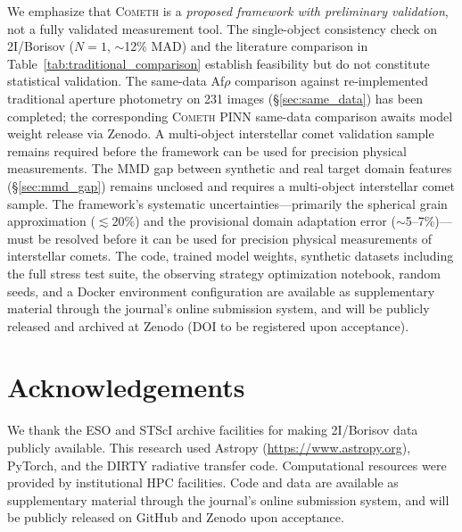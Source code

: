 \documentclass[usenatbib]{mnras}
\begin{document}
We emphasize that \textsc{Cometh} is a \textit{proposed framework with preliminary validation}, not a fully validated measurement tool. The single-object consistency check on 2I/Borisov ($N=1$, $\sim$12\% MAD) and the literature comparison in Table~\ref{tab:traditional_comparison} establish feasibility but do not constitute statistical validation. The same-data Af$\rho$ comparison against re-implemented traditional aperture photometry on 231 images (\S\ref{sec:same_data}) has been completed; the corresponding \textsc{Cometh} PINN same-data comparison awaits model weight release via Zenodo. A multi-object interstellar comet validation sample remains required before the framework can be used for precision physical measurements. The MMD gap between synthetic and real target domain features (\S\ref{sec:mmd_gap}) remains unclosed and requires a multi-object interstellar comet sample. The framework's systematic uncertainties---primarily the spherical grain approximation ($\lesssim 20\%$) and the provisional domain adaptation error ($\sim$5--7\%)---must be resolved before it can be used for precision physical measurements of interstellar comets. The code, trained model weights, synthetic datasets including the full stress test suite, the observing strategy optimization notebook, random seeds, and a Docker environment configuration are available as supplementary material through the journal's online submission system, and will be publicly released and archived at Zenodo (DOI to be registered upon acceptance).

\section*{Acknowledgements}
We thank the ESO and STScI archive facilities for making 2I/Borisov data publicly available. This research used Astropy (\url{https://www.astropy.org}), PyTorch, and the DIRTY radiative transfer code. Computational resources were provided by institutional HPC facilities. Code and data are available as supplementary material through the journal's online submission system, and will be publicly released on GitHub and Zenodo upon acceptance.
\end{document}
